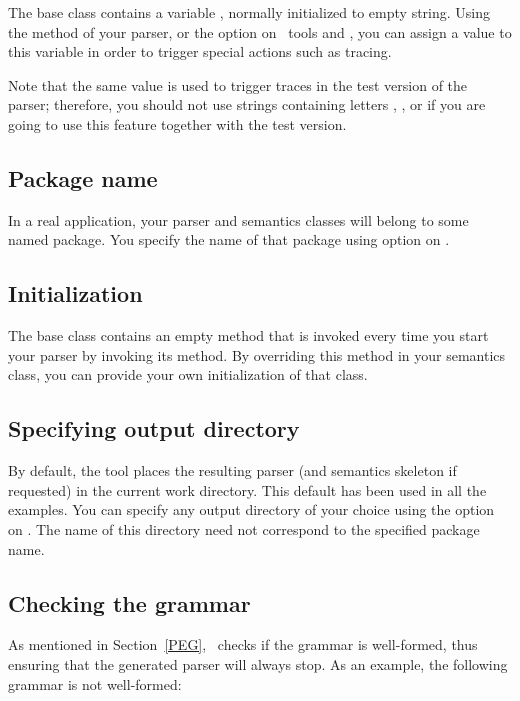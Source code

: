 The base class  contains a  variable
, normally initialized to empty string.
Using the method  of your parser, 
or the option  on \Mouse\ tools  and ,
you can assign a value to this variable in order to trigger special actions
such as tracing.

Note that the same value is used to trigger traces in the test version
of the parser; therefore, you should not use strings containing 
letters , , or  if you are going to use this feature
together with the test version.


\subsection{Package name}

In a real application, your parser and semantics classes will belong to some
named package.
You specify the name of that package using option  on 
.

\subsection{Initialization}

The base class  contains an empty method
 that is invoked every time you start your parser
by invoking its  method.
By overriding this method in your semantics class,
you can provide your own initialization of that class.


\subsection{Specifying output directory}

By default, the  tool places the resulting parser
(and semantics skeleton if requested) in the current work directory.
This default has been used in all the examples.
You can specify any output directory of your choice using the 
option on .
The name of this directory need not correspond to the specified package name.

\subsection{Checking the grammar}

As mentioned in Section~\ref{PEG}, \Mouse\ checks if the grammar is well-formed,
thus ensuring that the generated parser will always stop.
As an example, the following grammar is not well-formed:

